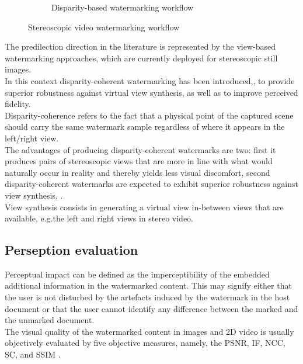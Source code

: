 \begin{figure}[h!]
\begin{subfigure}[]{0.4\textwidth}
\caption{\small{Disparity-based watermarking workflow}}
\label{fig:disp}
\end{subfigure}
\caption{\small{Stereoscopic video watermarking workflow}\label{stereo_method}}
\end{figure}

The predilection direction in the literature is represented by the view-based watermarking approaches, which are currently deployed for stereoscopic still images.\\ 
In this context disparity-coherent watermarking has been introduced,\cite{DOER}, to provide superior robustness against virtual view synthesis, as well as to improve perceived fidelity.\\
Disparity-coherence refers to the fact that a physical point of the captured scene should carry the
same watermark sample regardless of where it appears in the left/right view.\\
The advantages of producing disparity-coherent watermarks are two: first it produces pairs of stereoscopic views that are more in line with
what would naturally occur in reality and thereby yields less visual discomfort, second  disparity-coherent watermarks are expected to exhibit superior robustness against view synthesis, \cite{DOER}.\\
View synthesis consists in generating a virtual view in-between views that are available, e.g.the left and right views in stereo video. 

\subsection{Perseption evaluation}

Perceptual impact can be defined as the imperceptibility of the embedded additional information in the watermarked content. This may signify either that the user is not disturbed by the artefacts induced by the watermark in the host document or that the user cannot identify any difference between the marked and the unmarked document.\\
The visual quality of the watermarked content in images and 2D video is usually objectively evaluated by five objective measures, namely, the PSNR, IF, NCC, SC, and SSIM \cite{METRICS}.\\

